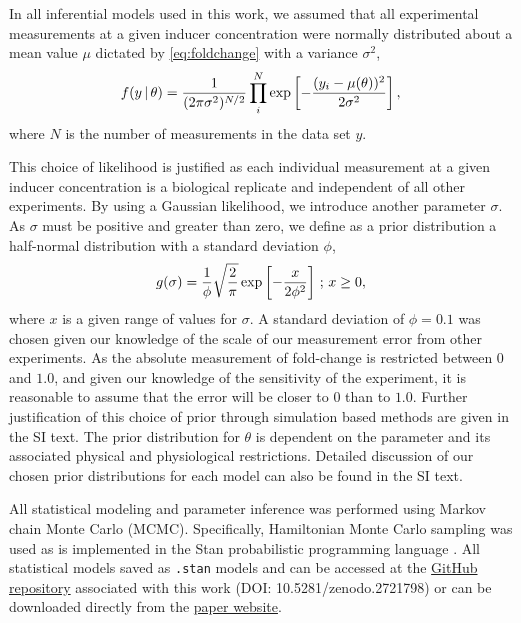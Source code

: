 In all inferential models used in this work, we assumed that all experimental measurements at a
given inducer concentration were normally distributed about a mean value $\mu$
dictated by \eqref{eq:foldchange} with a variance $\sigma^2$, 
\begin{equation}
    f(y\,\vert\, \theta) = {1 \over (2\pi\sigma^2)^{N/2}}\prod\limits_i^N \exp\left[-{(y_i - \mu(\theta))^2 \over 2\sigma^2}\right],
    \label{eq:generic_likelihood}
\end{equation}
where $N$ is the number of measurements in the data set $y$.

This choice of likelihood is justified as each individual measurement at a given
inducer concentration is a biological replicate and independent of all other
experiments. By using a Gaussian likelihood, we introduce another parameter
$\sigma$. As $\sigma$ must be positive and greater than zero, we define as a prior
distribution  a half-normal distribution with a standard deviation $\phi$, 
\begin{equation}
    g(\sigma) = {{1 \over \phi}\sqrt{2 \over \pi}}\exp\left[-{x \over 2\phi^2}\right]\,;\, x \geq 0 
    \label{eq:sigma_prior},
\end{equation}
where $x$ is a given range of values for $\sigma$. A standard deviation of
$\phi=0.1$ was chosen given our knowledge of the scale of our measurement
error from other experiments. As the absolute measurement of fold-change is
restricted between $0$ and $1.0$, and given our knowledge of the sensitivity
of the experiment, it is reasonable to assume that the error will be closer
to $0$ than to $1.0$. Further justification of this choice of prior through
simulation based methods are given in the SI text. The prior distribution for
$\theta$ is dependent on the parameter and its associated physical and
physiological restrictions. Detailed discussion of our chosen prior
distributions for each model can also be found in the SI text.

All statistical modeling and parameter inference was performed using Markov
chain Monte Carlo (MCMC). Specifically, Hamiltonian Monte Carlo sampling was
used as is implemented in the Stan probabilistic programming language \cite{Carpenter2017}. All
statistical models saved as \texttt{.stan} models and can be accessed at the
\href{https://www.github.com/rpgroup-pboc/mwc_mutants}{GitHub repository}
associated with this work (DOI: 10.5281/zenodo.2721798) or can be downloaded directly from the
\href{https://www.rpgroup.caltech.edu/mwc_mutants}{paper website}. 

